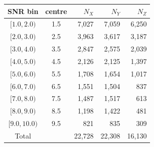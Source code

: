 \begin{tabular}{ccrrr}
\hline
SNR bin & centre & $N_X$ & $N_Y$ & $N_Z$ \\
\hline
$[1.0,2.0)$ & 1.5 & 7,027 & 7,059 & 6,250 \\
$[2.0,3.0)$ & 2.5 & 3,963 & 3,617 & 3,187 \\
$[3.0,4.0)$ & 3.5 & 2,847 & 2,575 & 2,039 \\
$[4.0,5.0)$ & 4.5 & 2,126 & 2,125 & 1,397 \\
$[5.0,6.0)$ & 5.5 & 1,708 & 1,654 & 1,017 \\
$[6.0,7.0)$ & 6.5 & 1,551 & 1,504 & 837 \\
$[7.0,8.0)$ & 7.5 & 1,487 & 1,517 & 613 \\
$[8.0,9.0)$ & 8.5 & 1,198 & 1,422 & 481 \\
$[9.0,10.0)$ & 9.5 & 821 & 835 & 309 \\
\hline
Total & & 22,728 & 22,308 & 16,130 \\
\hline
\end{tabular}
